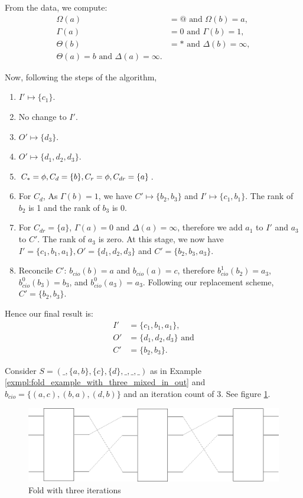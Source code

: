 From the data, we compute:
\begin{align*}
  \Omega(a) &= @\text{ and }\Omega(b) = a,\\
  \Gamma(a) &=0\text{ and }\Gamma(b) = 1,\\
  \Theta(b) &=*\text{ and }\Delta(b)=\infty,\\
  \Theta(a)=b\text{ and } \Delta(a)=\infty.
\end{align*}

Now, following the steps of the algorithm,
\begin{enumerate}
  \item $I' \mapsto \{c_1\}$.
  \item No change to $I'$.
  \item $O' \mapsto \{d_3\}$.
  \item $O' \mapsto \{d_1,d_2,d_3\}$.
  \item $C_*=\phi, C_d=\{b\}, C_r =\phi, C_{dr}=\{a\}$.
  \item For $C_d$, As $\Gamma(b)=1$, we have $C' \mapsto \{b_2,b_3\}$ and
    $I' \mapsto \{c_1,b_1\}$. The rank of $b_2$ is 1 and the rank of $b_3$
    is 0.
  \item For $C_{dr}=\{a\}$, $\Gamma(a)=0$ and $\Delta(a)=\infty$, therefore
    we add $a_1$ to $I'$ and $a_3$ to $C'$. The rank of $a_3$ is zero.
    At this stage, we now have
    $I'=\{c_1,b_1,a_1\}, O'=\{d_1,d_2,d_3\}$ and $C'=\{b_2,b_3,a_3\}$.
  \item Reconcile $C'$: $b_{cio}(b)=a$ and $b_{cio}(a)=c$, therefore
    $b_{cio}^1(b_2)=a_3$, $b_{cio}^0(b_3)=b_3$, and $b_{cio}^0(a_3)=a_3$.
    Following our replacement scheme, $C'=\{b_2,b_3\}$.
\end{enumerate}

Hence our final result is:
\begin{align*}
  I'&=\{c_1,b_1,a_1\},\\
  O'&=\{d_1,d_2,d_3\}\text{ and}\\
  C'&=\{b_2,b_3\}.
\end{align*}

\begin{example}\label{exmpl:fold_example_with_partial_bcio}
  Consider $S=(\_,\{a,b\},\{c\},\{d\},\_,\_,\_)$ as in Example
  \ref{exmpl:fold_example_with_three_mixed_in_out} and
  $b_{cio}=\{(a,c),(b,a),(d,b)\}$ and an iteration count of $3$. See figure
  \ref{fig:Fold_with_three_iterations}.
\end{example}
\begin{figure}[htbp]
  \centering
    \includegraphics[scale=.5]{diagrams/FoldThree.png}
  \caption{Fold with three iterations}
  \label{fig:Fold_with_three_iterations}
\end{figure}

